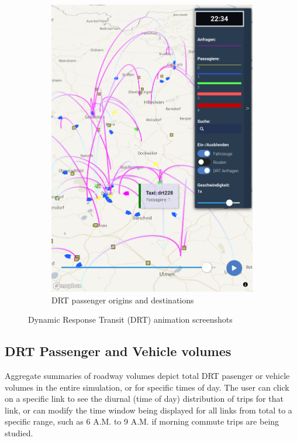 \documentclass[3p,times,procedia]{elsarticle}
\begin{document}
\begin{figure}[ht]
\begin{subfigure}[c]{0.4\textwidth}
   \includegraphics[width=\linewidth]{images/fig-drt-flyovers.png}
   \caption{DRT passenger origins and destinations}
   \label{fig:flyover}
\end{subfigure}
\caption{Dynamic Response Transit (DRT) animation screenshots}
\end{figure}


\subsection{DRT Passenger and Vehicle volumes}

Aggregate summaries of roadway volumes depict total DRT pasenger or vehicle volumes in the entire simulation, or for specific times of day. The user can click on a specific link to see the diurnal (time of day) distribution of trips for that link, or can modify the time window being displayed for all links from total to a specific range, such as 6 A.M. to 9 A.M. if morning commute trips are being studied.
\end{document}

